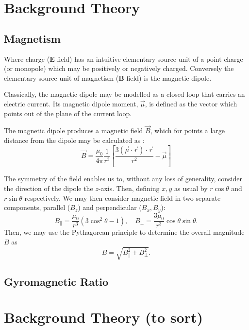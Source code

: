 \chapter{Background Theory}
\section{Magnetism}
Where charge ($\mathbf{E}$-field) has an intuitive elementary source unit of a point charge (or monopole) which may be positively or negatively charged. Conversely the elementary source unit of magnetism ($\mathbf{B}$-field) is the magnetic dipole. 

Classically, the magnetic dipole may be modelled as a closed loop that carries an
electric current. 
Its magnetic dipole moment, $\vec{\mu}$, is defined as the vector which points out of the plane
of the current loop. 

The magnetic dipole produces a magnetic field $\vec{B}$, which for points a large distance from the dipole may be calculated as :
$$\vec{B} = \frac{\mu_0}{4\pi} \frac{1}{r^3} \left[\frac{3(\vec{\mu} \cdot \vec{r}) \cdot \vec{r}}{r^2} - \vec{\mu}\right]$$

The symmetry of the field enables us to, without any loss of generality, consider the direction of the dipole the $z$-axis. Then, defining $x,y$ as usual by $r \cos\theta$ and $r \sin\theta$ respectively. We may then consider magnetic field in two separate components, parallel ($B_z$) and perpendicular ($B_x, B_y$): 
$$B_\parallel =\frac{\mu_0}{r^3}(3\cos^2 \theta - 1), \quad B_\perp = \frac{3\mu_0}{r^3}\cos\theta\sin\theta.$$
Then, we may use the Pythagorean principle to determine the overall magnitude $B$ as
$$B = \sqrt{B_\parallel^2 + B_\perp^2}.$$

\section{Gyromagnetic Ratio}


\chapter{Background Theory (to sort)}



